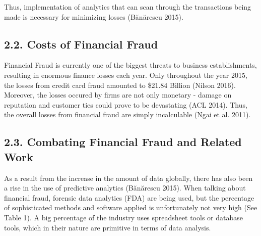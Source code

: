 \documentclass[12pt,]{article}
\begin{document}
Thus, implementation of analytics that can scan through the transactions
being made is necessary for minimizing losses (Bănărescu 2015).

\hypertarget{costs-of-financial-fraud}{%
\subsection{2.2. Costs of Financial
Fraud}\label{costs-of-financial-fraud}}

Financial Fraud is currently one of the biggest threats to business
establishments, resulting in enormous finance losses each year. Only
throughout the year 2015, the losses from credit card fraud amounted to
\$21.84 Billion (Nilson 2016). Moreover, the losses occured by firms are
not only monetary - damage on reputation and customer ties could prove
to be devastating (ACL 2014). Thus, the overall losses from financial
fraud are simply incalculable (Ngai et al. 2011).

\hypertarget{combating-financial-fraud-and-related-work}{%
\subsection{2.3. Combating Financial Fraud and Related
Work}\label{combating-financial-fraud-and-related-work}}

As a result from the increase in the amount of data globally, there has
also been a rise in the use of predictive analytics (Bănărescu 2015).
When talking about financial fraud, forensic data analytics (FDA) are
being used, but the percentage of sophisticated methods and software
applied is unfortunately not very high (See Table 1). A big percentage
of the industry uses spreadsheet tools or database tools, which in their
nature are primitive in terms of data analysis.
\end{document}
